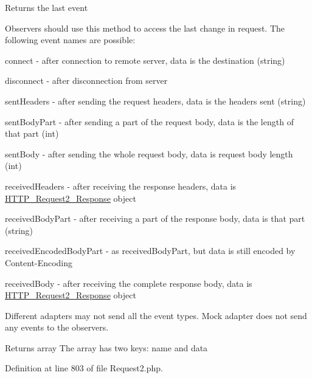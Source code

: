 Returns the last event

Observers should use this method to access the last change in request. The following event names are possible\+: 
\begin{DoxyItemize}
\item \textquotesingle{}connect\textquotesingle{} -\/ after connection to remote server, data is the destination (string) 
\item \textquotesingle{}disconnect\textquotesingle{} -\/ after disconnection from server 
\item \textquotesingle{}sent\+Headers\textquotesingle{} -\/ after sending the request headers, data is the headers sent (string) 
\item \textquotesingle{}sent\+Body\+Part\textquotesingle{} -\/ after sending a part of the request body, data is the length of that part (int) 
\item \textquotesingle{}sent\+Body\textquotesingle{} -\/ after sending the whole request body, data is request body length (int) 
\item \textquotesingle{}received\+Headers\textquotesingle{} -\/ after receiving the response headers, data is \hyperlink{classHTTP__Request2__Response}{H\+T\+T\+P\+\_\+\+Request2\+\_\+\+Response} object 
\item \textquotesingle{}received\+Body\+Part\textquotesingle{} -\/ after receiving a part of the response body, data is that part (string) 
\item \textquotesingle{}received\+Encoded\+Body\+Part\textquotesingle{} -\/ as \textquotesingle{}received\+Body\+Part\textquotesingle{}, but data is still encoded by Content-\/\+Encoding 
\item \textquotesingle{}received\+Body\textquotesingle{} -\/ after receiving the complete response body, data is \hyperlink{classHTTP__Request2__Response}{H\+T\+T\+P\+\_\+\+Request2\+\_\+\+Response} object 
\end{DoxyItemize}Different adapters may not send all the event types. Mock adapter does not send any events to the observers.

\begin{DoxyReturn}{Returns}
array The array has two keys\+: \textquotesingle{}name\textquotesingle{} and \textquotesingle{}data\textquotesingle{} 
\end{DoxyReturn}


Definition at line 803 of file Request2.\+php.

\mbox{\label{classHTTP__Request2_a1a362b64dbeeb0321b55df04c6f2c820}} 
